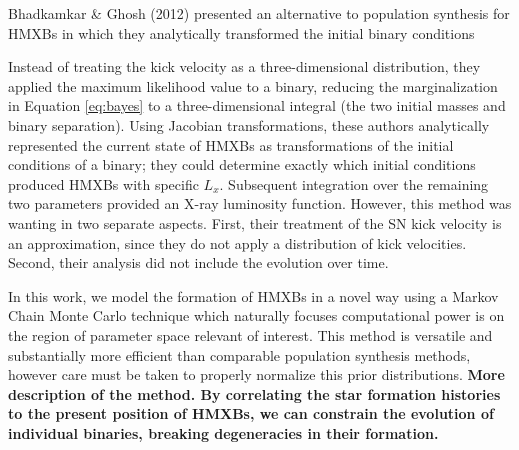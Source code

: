 \documentclass[usenatbib]{mnras}
\begin{document}
Bhadkamkar \& Ghosh (2012) presented an alternative to population synthesis for HMXBs in which they analytically transformed the initial binary conditions 


 Instead of treating the kick velocity as a three-dimensional distribution, they applied the maximum likelihood value to a binary, reducing the marginalization in Equation \ref{eq:bayes} to a three-dimensional integral (the two initial masses and binary separation). Using Jacobian transformations, these authors analytically represented the current state of HMXBs as transformations of the initial conditions of a binary; they could determine exactly which initial conditions produced HMXBs with specific $L_x$. Subsequent integration over the remaining two parameters provided an X-ray luminosity function. However, this method was wanting in two separate aspects. First, their treatment of the SN kick velocity is an approximation, since they do not apply a distribution of kick velocities. Second, their analysis did not include the evolution over time. 







In this work, we model the formation of HMXBs in a novel way using a Markov Chain Monte Carlo technique which naturally focuses computational power is on the region of parameter space relevant of interest. This method is versatile and substantially more efficient than comparable population synthesis methods, however care must be taken to properly normalize this prior distributions. {\bf More description of the method. By correlating the star formation histories to the present position of HMXBs, we can constrain the evolution of individual binaries, breaking degeneracies in their formation.} 
\end{document}
